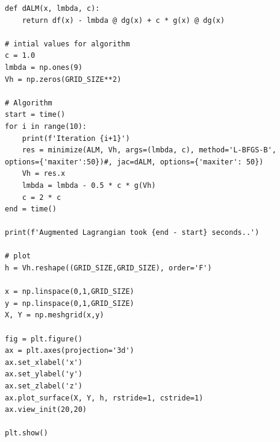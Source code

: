 \documentclass{article}
\begin{document}
\begin{verbatim}
def dALM(x, lmbda, c):
    return df(x) - lmbda @ dg(x) + c * g(x) @ dg(x) 

# intial values for algorithm
c = 1.0
lmbda = np.ones(9)
Vh = np.zeros(GRID_SIZE**2)

# Algorithm
start = time()
for i in range(10):
    print(f'Iteration {i+1}')
    res = minimize(ALM, Vh, args=(lmbda, c), method='L-BFGS-B', options={'maxiter':50})#, jac=dALM, options={'maxiter': 50})
    Vh = res.x
    lmbda = lmbda - 0.5 * c * g(Vh)
    c = 2 * c
end = time()

print(f'Augmented Lagrangian took {end - start} seconds..')

# plot
h = Vh.reshape((GRID_SIZE,GRID_SIZE), order='F')

x = np.linspace(0,1,GRID_SIZE)
y = np.linspace(0,1,GRID_SIZE)
X, Y = np.meshgrid(x,y)

fig = plt.figure()
ax = plt.axes(projection='3d')
ax.set_xlabel('x')
ax.set_ylabel('y')
ax.set_zlabel('z')
ax.plot_surface(X, Y, h, rstride=1, cstride=1)
ax.view_init(20,20)

plt.show()
\end{verbatim}
\end{document}
